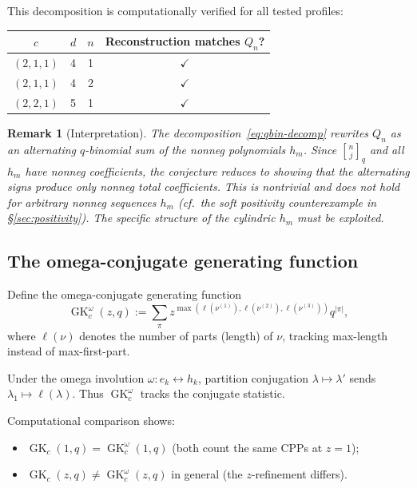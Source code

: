 \documentclass[11pt]{article}
\newtheorem{remark}[theorem]{Remark}
\newcommand{\GK}{\operatorname{GK}}
\newcommand{\qbin}[2]{\genfrac{[}{]}{0pt}{}{#1}{#2}}
\begin{document}
This decomposition is computationally verified for all tested profiles:

\begin{center}
\begin{tabular}{c|c|c|c}
$c$ & $d$ & $n$ & Reconstruction matches $Q_n$? \\
\hline
$(2,1,1)$ & 4 & 1 & $\checkmark$ \\
$(2,1,1)$ & 4 & 2 & $\checkmark$ \\
$(2,2,1)$ & 5 & 1 & $\checkmark$ \\
\end{tabular}
\end{center}

\begin{remark}[Interpretation]
The decomposition~\eqref{eq:qbin-decomp} rewrites $Q_n$ as an alternating
$q$-binomial sum of the nonneg polynomials $h_m$. Since $\qbin{n}{j}_q$
and all $h_m$ have nonneg coefficients, the conjecture reduces to showing
that the alternating signs produce only nonneg total coefficients. This is
nontrivial and does \emph{not} hold for arbitrary nonneg sequences $h_m$
(cf.\ the soft positivity counterexample in \S\ref{sec:positivity}).
The specific structure of the cylindric $h_m$ must be exploited.
\end{remark}

\subsection{The omega-conjugate generating function}

Define the omega-conjugate generating function
\[
  \GK_c^\omega(z,q) := \sum_\pi z^{\max(\ell(\nu^{(1)}), \ell(\nu^{(2)}), \ell(\nu^{(3)}))} q^{|\pi|},
\]
where $\ell(\nu)$ denotes the number of parts (length) of $\nu$, tracking
max-length instead of max-first-part.

Under the omega involution $\omega: e_k \leftrightarrow h_k$, partition
conjugation $\lambda \mapsto \lambda'$ sends $\lambda_1 \mapsto \ell(\lambda)$.
Thus $\GK_c^\omega$ tracks the conjugate statistic.

Computational comparison shows:
\begin{itemize}
  \item $\GK_c(1,q) = \GK_c^\omega(1,q)$ (both count the same CPPs at $z=1$);
  \item $\GK_c(z,q) \neq \GK_c^\omega(z,q)$ in general (the $z$-refinement differs).
\end{itemize}
\end{document}
